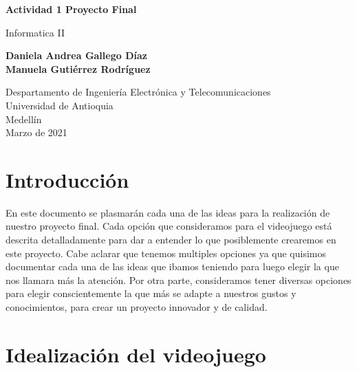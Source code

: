 \documentclass{article}
\begin{document}
\begin{titlepage}
    \begin{center}
        \vspace*{1cm}
            
        \Huge
        \textbf {Actividad 1 Proyecto Final}
            
        \vspace{0.5cm}
        \LARGE
        Informatica II
            
        \vspace{1.5cm}
            
        \textbf{Daniela Andrea Gallego Díaz\\ Manuela Gutiérrez Rodríguez }
            
        \vfill
            
        \vspace{0.8cm}
            
        \Large
        Despartamento de Ingeniería Electrónica y Telecomunicaciones\\
        Universidad de Antioquia\\
        Medellín\\
        Marzo de 2021
            
    \end{center}
\end{titlepage}

\tableofcontents
\newpage
\section{Introducción}\label{intro}
En este documento se plasmarán cada una de las ideas para la realización de nuestro proyecto final. Cada opción que consideramos para el videojuego está descrita detalladamente para dar a entender lo que posiblemente crearemos en este proyecto. Cabe aclarar que tenemos multiples opciones ya que quisimos documentar cada una de las ideas que ibamos teniendo para luego elegir la que nos llamara más la atención. Por otra parte, consideramos tener diversas opciones para elegir conscientemente la que más se adapte a nuestros gustos y conocimientos, para crear un proyecto innovador y de calidad.


\section{Idealización del videojuego} \label{contenido}
\end{document}
